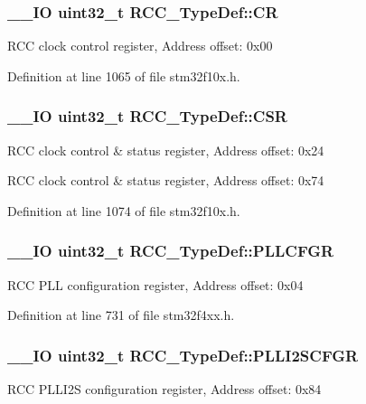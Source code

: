 \hypertarget{struct_r_c_c___type_def_abcb9ff48b9afb990283fefad0554b5b3}{
\subsubsection[{C\-R}]{\setlength{\rightskip}{0pt plus 5cm}\-\_\-\-\_\-\-I\-O {\bf uint32\-\_\-t} R\-C\-C\-\_\-\-Type\-Def\-::\-C\-R}}\label{struct_r_c_c___type_def_abcb9ff48b9afb990283fefad0554b5b3}
R\-C\-C clock control register, Address offset\-: 0x00 

Definition at line 1065 of file stm32f10x.\-h.

\hypertarget{struct_r_c_c___type_def_a7e913b8bf59d4351e1f3d19387bd05b9}{
\subsubsection[{C\-S\-R}]{\setlength{\rightskip}{0pt plus 5cm}\-\_\-\-\_\-\-I\-O {\bf uint32\-\_\-t} R\-C\-C\-\_\-\-Type\-Def\-::\-C\-S\-R}}\label{struct_r_c_c___type_def_a7e913b8bf59d4351e1f3d19387bd05b9}
R\-C\-C clock control \& status register, Address offset\-: 0x24

R\-C\-C clock control \& status register, Address offset\-: 0x74 

Definition at line 1074 of file stm32f10x.\-h.

\hypertarget{struct_r_c_c___type_def_a2a7ccb4e23cb05a574f243f6278b7b26}{
\subsubsection[{P\-L\-L\-C\-F\-G\-R}]{\setlength{\rightskip}{0pt plus 5cm}\-\_\-\-\_\-\-I\-O {\bf uint32\-\_\-t} R\-C\-C\-\_\-\-Type\-Def\-::\-P\-L\-L\-C\-F\-G\-R}}\label{struct_r_c_c___type_def_a2a7ccb4e23cb05a574f243f6278b7b26}
R\-C\-C P\-L\-L configuration register, Address offset\-: 0x04 

Definition at line 731 of file stm32f4xx.\-h.

\hypertarget{struct_r_c_c___type_def_ac3beb02dccd9131d6ce55bb29c5fa69f}{
\subsubsection[{P\-L\-L\-I2\-S\-C\-F\-G\-R}]{\setlength{\rightskip}{0pt plus 5cm}\-\_\-\-\_\-\-I\-O {\bf uint32\-\_\-t} R\-C\-C\-\_\-\-Type\-Def\-::\-P\-L\-L\-I2\-S\-C\-F\-G\-R}}\label{struct_r_c_c___type_def_ac3beb02dccd9131d6ce55bb29c5fa69f}
R\-C\-C P\-L\-L\-I2\-S configuration register, Address offset\-: 0x84 

